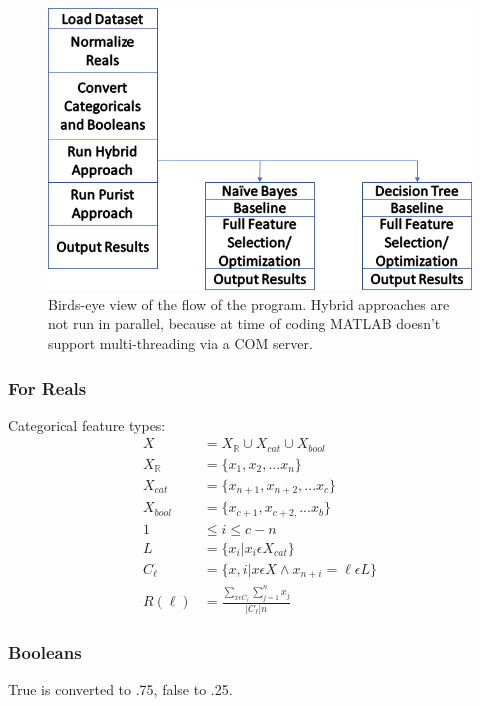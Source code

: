 \documentclass{beamer}
\begin{document}
\begin{frame}
\begin{figure}
	\centering
	\includegraphics[width=0.7\linewidth]{figures/png/ProgramFlow}
	\caption[Overall Program Flow]{Birds-eye view of the flow of the program.
		Hybrid approaches are not run in parallel, because at time of coding MATLAB
		doesn't support multi-threading via a COM server.}
	\label{fig:ProgramFlow}
\end{figure}
\end{frame}
\begin{frame}
	\frametitle{For Reals}
	Categorical feature types:
	\begin{align*}
	X &= {X_\mathbb{R} \cup X_{cat} \cup X_{bool}}\\
	X_\mathbb{R} &= \{x_1, x_2, ... x_n\}\\
	X_{cat} &= \{x_{n+1}, x_{n+2}, ... x_c\}\\%
	X_{bool} &= \{x_{c+1}, x_{c+2,} ... x_b\} \\
	1&\leq i \leq c-n\\
	L &= \{x_i|x_i\epsilon X_{cat}\}\\%
	C_\ell &= \{x, i|  x\epsilon X \wedge x_{n+i} = \ell\epsilon L \}\\%
	R(\ell) &= \frac{\sum_{x\epsilon C_\ell}\sum_{j=1}^{n}x_j}{|C_\ell|n}
	\end{align*}
	
\end{frame}
\begin{frame}
	\frametitle{Booleans}
	True is converted to .75, false to .25.
\end{frame}
\end{document}
